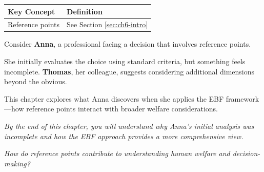\begin{tcolorbox}[
    colback=gray!5!white,
    colframe=gray!75!black,
    title={\textbf{Begriffe in diesem Kapitel}},
    fonttitle=\bfseries
]
\small
\begin{tabular}{@{}ll@{}}
\textbf{Key Concept} & \textbf{Definition} \\
\midrule
Reference points & See Section \ref{sec:ch6-intro} \\
\end{tabular}
\end{tcolorbox}



\begin{tcolorbox}[
    colback=blue!5!white,
    colframe=blue!75!black,
    title={\textbf{Intuition: A Motivating Example}},
    fonttitle=\bfseries
]
Consider \textbf{Anna}, a professional facing a decision that involves reference points.

She initially evaluates the choice using standard criteria, but something feels incomplete.
\textbf{Thomas}, her colleague, suggests considering additional dimensions beyond the obvious.

This chapter explores what Anna discovers when she applies the EBF framework---how
reference points interact with broader welfare considerations.

\medskip
\textit{By the end of this chapter, you will understand why Anna's initial analysis
was incomplete and how the EBF approach provides a more comprehensive view.}
\end{tcolorbox}



\begin{tcolorbox}[
    colback=red!5!white,
    colframe=red!75!black,
    title={\textbf{Central Question}},
    fonttitle=\bfseries
]
\Large
\centering
\textit{How do reference points contribute to understanding human welfare and decision-making?}
\end{tcolorbox}

